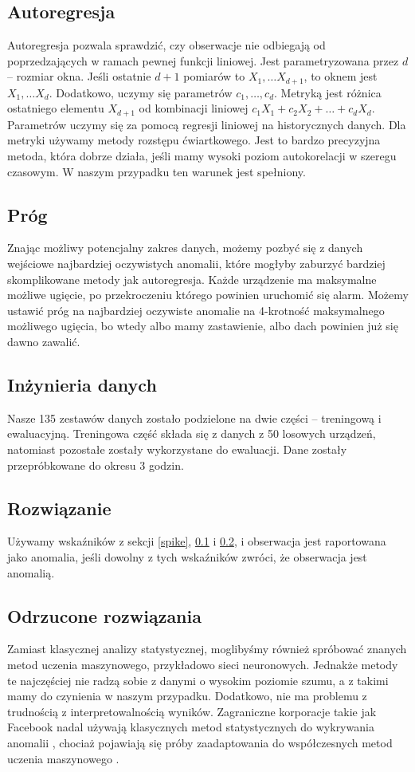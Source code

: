 \subsection{Autoregresja}\label{autoregression}
Autoregresja pozwala sprawdzić, czy obserwacje nie odbiegają od poprzedzających w ramach pewnej funkcji liniowej. Jest parametryzowana przez $d$ -- rozmiar okna. Jeśli ostatnie $d + 1$ pomiarów to $X_1, \ldots X_{d + 1}$, to oknem jest $X_1, \ldots X_d$. Dodatkowo, uczymy się parametrów $c_1, \ldots, c_d$. Metryką jest różnica ostatniego elementu $X_{d+1}$ od kombinacji liniowej $c_1X_1 + c_2X_2 + \ldots + c_dX_d$. Parametrów uczymy się za pomocą regresji liniowej na historycznych danych. Dla metryki używamy metody rozstępu ćwiartkowego. Jest to bardzo precyzyjna metoda, która dobrze działa, jeśli mamy wysoki poziom autokorelacji w szeregu czasowym. W naszym przypadku ten warunek jest spełniony.
\subsection{Próg}\label{threshold}
Znając możliwy potencjalny zakres danych, możemy pozbyć się z danych wejściowe najbardziej oczywistych anomalii, które mogłyby zaburzyć bardziej skomplikowane metody jak autoregresja. Każde urządzenie ma maksymalne możliwe ugięcie, po przekroczeniu którego powinien uruchomić się alarm. Możemy ustawić próg na najbardziej oczywiste anomalie na 4-krotność maksymalnego możliwego ugięcia, bo wtedy albo mamy zastawienie, albo dach powinien już się dawno zawalić.
\subsection{Inżynieria danych}
Nasze 135 zestawów danych zostało podzielone na dwie części -- treningową i ewaluacyjną. Treningowa część składa się z danych z 50 losowych urządzeń, natomiast pozostałe zostały wykorzystane do ewaluacji. Dane zostały przepróbkowane do okresu 3 godzin.
\subsection{Rozwiązanie}\label{solution}
Używamy wskaźników z sekcji \ref{spike}, \ref{autoregression} i \ref{threshold}, i obserwacja jest raportowana jako anomalia, jeśli dowolny z tych wskaźników zwróci, że obserwacja jest anomalią.
\subsection{Odrzucone rozwiązania}
Zamiast klasycznej analizy statystycznej, moglibyśmy również spróbować znanych metod uczenia maszynowego, przykładowo sieci neuronowych. Jednakże metody te najczęściej nie radzą sobie z danymi o wysokim poziomie szumu, a z takimi mamy do czynienia w naszym przypadku. Dodatkowo, nie ma problemu z trudnością z interpretowalnością wyników. Zagraniczne korporacje takie jak Facebook nadal używają klasycznych metod statystycznych do wykrywania anomalii \cite{Prophet}, chociaż pojawiają się próby zaadaptowania do współczesnych metod uczenia maszynowego \cite{Neuralprophet}.

